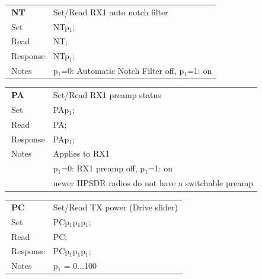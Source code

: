 \documentclass[12pt]{book}
\begin{document}
\begin{center}
\begin{tabular}{|p{2cm}|p{11cm}|}
\toprule
$\phantom{\Big|}$\textbf{\large NT} & Set/Read RX1 auto notch filter \\\cline{1-2}
$\phantom{\Big|}${\large Set} & {NTp$_1$;} \\\hline
$\phantom{\Big|}${\large Read} & {NT;} \\\hline
$\phantom{\Big|}${\large Response} & {NTp$_1$;} \\\hline
$\phantom{\Big|}${\large Notes} & \multicolumn{1}{|p{11cm}|}{p$_1$=0: Automatic Notch Filter off, p$_1$=1: on} \\
\bottomrule
\end{tabular}
\end{center}

\begin{center}
\begin{tabular}{|p{2cm}|p{11cm}|}
\toprule
$\phantom{\Big|}$\textbf{\large PA} & Set/Read RX1 preamp status \\\cline{1-2}
$\phantom{\Big|}${\large Set} & {PAp$_1$;} \\\hline
$\phantom{\Big|}${\large Read} & {PA;} \\\hline
$\phantom{\Big|}${\large Response} & {PAp$_1$;} \\\hline
$\phantom{\Big|}${\large Notes} & \multicolumn{1}{|p{11cm}|}{Applies to RX1} \\
 & \multicolumn{1}{|p{11cm}|}{p$_1$=0: RX1 preamp off, p$_1$=1: on} \\
 & \multicolumn{1}{|p{11cm}|}{newer HPSDR radios do not have a switchable preamp} \\
\bottomrule
\end{tabular}
\end{center}

\begin{center}
\begin{tabular}{|p{2cm}|p{11cm}|}
\toprule
$\phantom{\Big|}$\textbf{\large PC} & Set/Read TX power (Drive slider) \\\cline{1-2}
$\phantom{\Big|}${\large Set} & {PCp$_1$p$_1$p$_1$;} \\\hline
$\phantom{\Big|}${\large Read} & {PC;} \\\hline
$\phantom{\Big|}${\large Response} & {PCp$_1$p$_1$p$_1$;} \\\hline
$\phantom{\Big|}${\large Notes} & \multicolumn{1}{|p{11cm}|}{p$_1$ = 0...100} \\
\bottomrule
\end{tabular}
\end{center}
\end{document}
